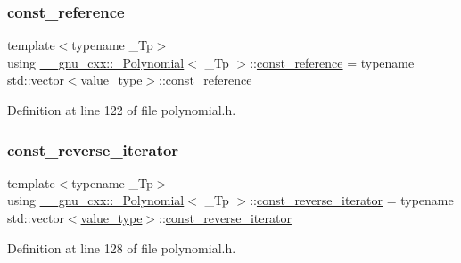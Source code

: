 \subsubsection{\texorpdfstring{const\+\_\+reference}{const\_reference}}
{\footnotesize\ttfamily template$<$typename \+\_\+\+Tp$>$ \\
using \hyperlink{class____gnu__cxx_1_1__Polynomial}{\+\_\+\+\_\+gnu\+\_\+cxx\+::\+\_\+\+Polynomial}$<$ \+\_\+\+Tp $>$\+::\hyperlink{class____gnu__cxx_1_1__Polynomial_a55e17774f3387e74adb57376d099cf16}{const\+\_\+reference} =  typename std\+::vector$<$\hyperlink{class____gnu__cxx_1_1__Polynomial_a725563351f50e76084a7a016c06f8a53}{value\+\_\+type}$>$\+::\hyperlink{class____gnu__cxx_1_1__Polynomial_a55e17774f3387e74adb57376d099cf16}{const\+\_\+reference}}



Definition at line 122 of file polynomial.\+h.

\mbox{\label{class____gnu__cxx_1_1__Polynomial_a2a042a80127ab9a7b0349a54791e59af}} 
\subsubsection{\texorpdfstring{const\+\_\+reverse\+\_\+iterator}{const\_reverse\_iterator}}
{\footnotesize\ttfamily template$<$typename \+\_\+\+Tp$>$ \\
using \hyperlink{class____gnu__cxx_1_1__Polynomial}{\+\_\+\+\_\+gnu\+\_\+cxx\+::\+\_\+\+Polynomial}$<$ \+\_\+\+Tp $>$\+::\hyperlink{class____gnu__cxx_1_1__Polynomial_a2a042a80127ab9a7b0349a54791e59af}{const\+\_\+reverse\+\_\+iterator} =  typename std\+::vector$<$\hyperlink{class____gnu__cxx_1_1__Polynomial_a725563351f50e76084a7a016c06f8a53}{value\+\_\+type}$>$\+::\hyperlink{class____gnu__cxx_1_1__Polynomial_a2a042a80127ab9a7b0349a54791e59af}{const\+\_\+reverse\+\_\+iterator}}



Definition at line 128 of file polynomial.\+h.

\mbox{\label{class____gnu__cxx_1_1__Polynomial_aefb6d7ae1935b99a332d5b96b1e82d32}} 
